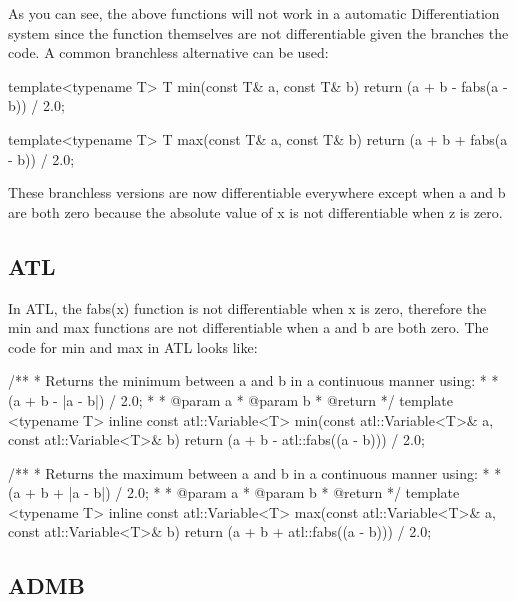 \documentclass[oneside]{article}
\begin{document}
As you can see, the above functions will not work in a automatic Differentiation system since the function themselves are not differentiable given the branches the code. A common branchless alternative can be used:
\begin{cppsource}
template<typename T>
T min(const T& a, const T& b){
   return (a + b - fabs(a - b)) / 2.0;
} 

template<typename T>
T max(const T& a, const T& b){
   return (a + b + fabs(a - b)) / 2.0;
} 
\end{cppsource}

These branchless versions are now differentiable everywhere except when a and b are both zero because the absolute value of x is not differentiable when z is zero. 

\subsection{ATL}
In ATL, the fabs(x) function is not differentiable when x is zero, therefore the min and max functions are not differentiable when a and b are both zero. The code for min and max in ATL looks like: 
\begin{cppsource}

/**
 * Returns the minimum between a and b in a continuous manner using:
 * 
 * (a + b - |a - b|) / 2.0;
 * 
 * @param a
 * @param b
 * @return 
 */
template <typename T>
inline const atl::Variable<T> min(const atl::Variable<T>& a, 
	const atl::Variable<T>& b) {
    return (a + b - atl::fabs((a - b))) / 2.0;
}

/**
 * Returns the maximum between a and b in a continuous manner using:
 * 
 * (a + b + |a - b|) / 2.0;
 * 
 * @param a
 * @param b
 * @return 
 */
template <typename T>
inline const atl::Variable<T> max(const atl::Variable<T>& a, 
	const atl::Variable<T>& b) {
    return (a + b + atl::fabs((a - b))) / 2.0;
}


\end{cppsource} 


\subsection{ADMB}
\end{document}
